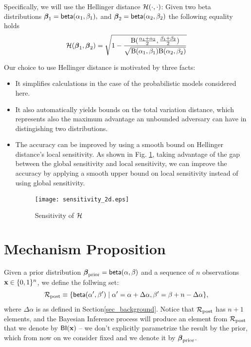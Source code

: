 \documentclass{article}
\begin{document}
Specifically, we will use the Hellinger distance $\mathcal{H}(\cdot,\cdot)$:
Given two beta distributions
$\boldsymbol{\beta}_1=\mathsf{beta}(\alpha_1, \beta_1),$ and $\boldsymbol{\beta}_2=\mathsf{beta}(\alpha_2, \beta_2)$ the following equality holds 
\[
  \mathcal{H}(\boldsymbol{\beta}_1, \boldsymbol{\beta}_2)=
  \sqrt{1 - \frac{\textup{B}(\frac{\alpha_1 + \alpha_2}{2}, \frac{\beta_1 + \beta_2}{2})}{\sqrt{\textup{B}(\alpha_1,\beta_1)\textup{B}(\alpha_2,\beta_2)}}}
\]

Our choice to use Hellinger distance is motivated by three facts:
\begin{itemize}
\item It simplifies calculations in the case of the probabilistic models considered here.
\item It also automatically yields bounds on the total variation distance, which represents also the maximum advantage
an unbounded adversary can have in distingishing two distributions. 
\item The accuracy can be improved by using a smooth bound on Hellinger distance's local sensitivity. As shown in Fig. \ref{fig_sensitivity}, taking advantage of the gap between the global sensitivity and local sensitivity, we can improve the accuracy by applying a smooth upper bound on local sensitivity instead of using global sensitivity.
\begin{figure}[ht]
\centering
\texttt{[image: sensitivity\_2d.eps]}
\caption{{Sensitivity of $\mathcal{H}$}}
\label{fig_sensitivity}
\end{figure}
\end{itemize}



\section{Mechanism Proposition}
\label{sec_mechs}
Given a prior distribution $\boldsymbol{\beta}_{\textup{prior}}=\mathsf{beta}(\alpha, \beta)$ and a sequence of $n$ observations $\textbf{x}\in\{0,1\}^n$, we define the follwing set:
\[
  \mathcal{R}_{\textup{post}}\equiv\{\mathsf{beta}(\alpha',\beta')\mid \alpha'=\alpha+\Delta\alpha, \beta'=\beta+n-\Delta\alpha\},
\]
where $\Delta\alpha$ is as defined in Section\ref{sec_background}.
Notice that $\mathcal{R}_{\textup{post}}$ has $n + 1$ elements, and
the Bayesian Inference process will produce an element from $\mathcal{R}_{\textup{post}}$
that we denote by $\mathsf{BI}(\textbf{x})$ -- we don't explicitly
parametrize the result by the prior, which from now on we consider
fixed and we denote it by $\boldsymbol{\beta}_{\textup{prior}}$.
\end{document}
